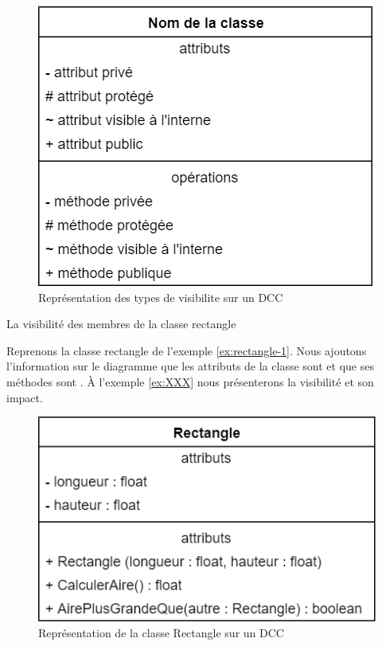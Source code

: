 \begin{figure}[H]
	\caption{Représentation des types de \gls{visibilite} sur un \acrshort{DCC}}
	\centering
	\includegraphics[scale=0.4]{dcc-visibilite.png}
\end{figure}

\begin{exemple}[label = ex:rect-visibilite]{La visibilité des membres de la classe rectangle}
	
	Reprenons la classe rectangle de l'exemple \ref{ex:rectangle-1}. Nous ajoutons l'information sur le diagramme que les attributs de la classe sont  et que ses méthodes sont . À l'exemple \ref{ex:XXX} nous présenterons la visibilité  et son impact.
	
	\begin{figure}[H]
		\caption{Représentation de la classe Rectangle sur un \acrshort{DCC}}
		\centering
		\includegraphics[scale=0.4]{dcc-rect-visibilite.png}
	\end{figure}
	
	
\end{exemple}


